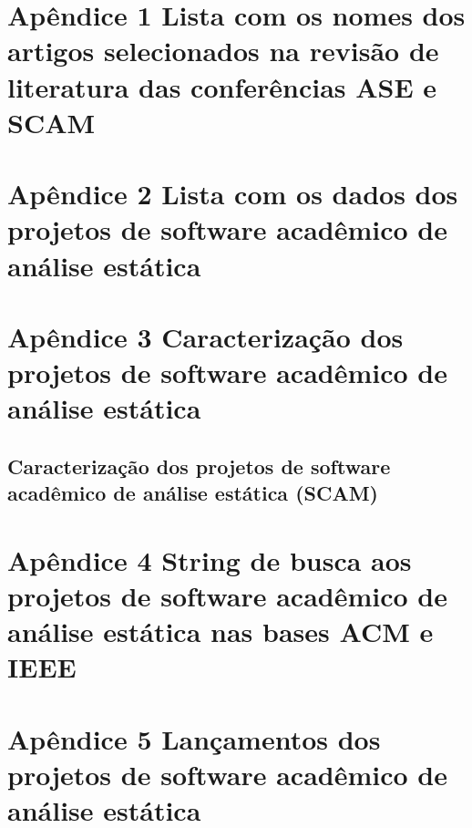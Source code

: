 \documentclass{article}
\begin{document}
\section{Apêndice 1 Lista com os nomes dos artigos selecionados na revisão de literatura das conferências ASE e SCAM}



\section{Apêndice 2 Lista com os dados dos projetos de software acadêmico de análise estática}



\section{Apêndice 3 Caracterização dos projetos de software acadêmico de análise estática}



\subsection{Caracterização dos projetos de software acadêmico de análise estática (SCAM)}



\section{Apêndice 4 String de busca aos projetos de software acadêmico de análise estática nas bases ACM e IEEE}



\section{Apêndice 5 Lançamentos dos projetos de software acadêmico de análise estática}


\end{document}
